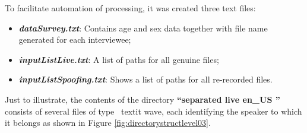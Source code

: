 		\par To facilitate automation of processing, it was created three text files:
		\begin{itemize}
			\item \textit{\textbf{dataSurvey.txt}}: Contains age and sex data together with file name generated for each interviewee;
			\item \textit{\textbf{inputListLive.txt}}: A list of paths for all genuine files;
			\item \textit{\textbf{inputListSpoofing.txt}}: Shows a list of paths for all re-recorded files.
		\end{itemize}
	
		\par Just to illustrate, the contents of the directory \textbf{``separated \textfractionsolidus live \textfractionsolidus en\_US ''} consists of several files of type \ textit {wave}, each identifying the speaker to which it belongs as shown in Figure  \ref{fig:directorystructlevel03}.
	
